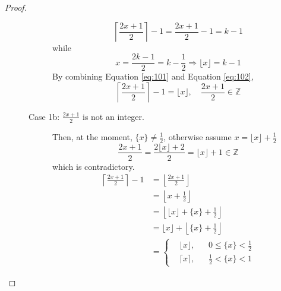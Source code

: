 \documentclass[a4paper,12pt]{article}
\theoremstyle{definition}
\newenvironment{problems}{\begin{list}{}{\renewcommand{\makelabel}[1]{\textbf{##1}\hfil}}}{\end{list}}
\begin{document}
\begin{problems}
\begin{proof}
\begin{description}
\begin{description}
\begin{equation}
                    \left\lceil\frac{2x+1}{2}\right\rceil - 1 =  \frac{2x+1}{2} - 1 = k - 1
                \end{equation}  
                while 
                \begin{equation}\label{eq:102}
                    x = \frac{2k-1}{2} = k - \frac{1}{2} \Rightarrow \lfloor x \rfloor = k - 1
                \end{equation}
                By combining Equation \eqref{eq:101} and Equation \eqref{eq:102},
                \begin{equation}
                    \left\lceil\frac{2x+1}{2}\right\rceil - 1 = \lfloor x \rfloor,\quad \frac{2x+1}{2}\in \mathbb{Z}
                \end{equation}
                \item[Case 1b: $\frac{2x+1}{2}$ is not an integer.] Then, at the moment, $\{x\}\neq \frac{1}{2}$, otherwise assume $x = \lfloor x \rfloor + \frac{1}{2}$
                \begin{equation*}
                    \frac{2x+1}{2} =  \frac{2\lfloor x \rfloor + 2}{2} = \lfloor x \rfloor + 1 \in \mathbb{Z}
                \end{equation*}
                which is contradictory.
                \begin{align}
                    \left\lceil\frac{2x+1}{2}\right\rceil - 1 &= \left\lfloor\frac{2x+1}{2}\right\rfloor \nonumber\\
                    &=  \left\lfloor x+\frac{1}{2}\right\rfloor \nonumber \\
                    &= \left\lfloor \lfloor x \rfloor + \{x\}+\frac{1}{2}\right\rfloor \nonumber \\
                    &= \lfloor x \rfloor + \left\lfloor \{x\}+\frac{1}{2}\right\rfloor \nonumber \\
                    &= \left\{ \begin{aligned}
                        &\lfloor x \rfloor, &&0\leq \{x\}<\frac{1}{2}\\
                        &\lceil x \rceil, &&\frac{1}{2}< \{x\}<1
                    \end{aligned} \right.\label{eq:103}
                \end{align} 

\end{description}
\end{description}
\end{proof}
\end{problems}
\end{document}
